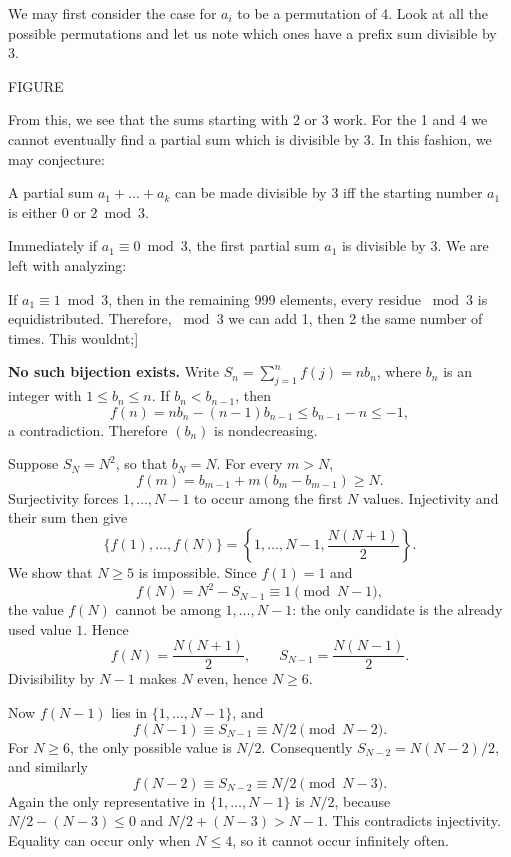 \documentclass[12pt]{memoir}
\begin{document}
\begin{Ej}
    We may first consider the case for \(a_i\) to be a permutation of 4. Look at all the possible permutations and let us note which ones have a prefix sum divisible by 3. 
    \begin{center}
        FIGURE
    \end{center}
    From this, we see that the sums starting with 2 or 3 work. For the 1 and 4 we cannot eventually find a partial sum which is divisible by 3. In this fashion, we may conjecture:
    \begin{significant}
    A partial sum \(a_1+\dots+a_k\) can be made divisible by 3 iff the starting number \(a_1\) is either \(0\) or \(2 \bmod 3\). 
    \end{significant}
    Immediately if \(a_1\equiv0\bmod 3\), the first partial sum \(a_1\) is divisible by 3. We are left with analyzing:\par
    If \(a_1\equiv 1 \bmod 3\), then in the remaining 999 elements, every residue \(\bmod 3\) is equidistributed. Therefore, \(\bmod 3\) we can add 1, then 2 the same number of times. This wouldnt;]
\end{Ej}

\begin{Ej}
\textbf{No such bijection exists.}
Write \(S_n=\sum_{j=1}^n f(j)=nb_n\), where \(b_n\) is an integer
with \(1\leq b_n\leq n\). If \(b_n<b_{n-1}\), then
\[
    f(n)=nb_n-(n-1)b_{n-1}
    \leq b_{n-1}-n\leq-1,
\]
a contradiction. Therefore \((b_n)\) is nondecreasing.

Suppose \(S_N=N^2\), so that \(b_N=N\). For every \(m>N\),
\[
    f(m)=b_{m-1}+m(b_m-b_{m-1})\geq N.
\]
Surjectivity forces \(1,\ldots,N-1\) to occur among the first \(N\)
values. Injectivity and their sum then give
\[
    \{f(1),\ldots,f(N)\}
    =\left\{1,\ldots,N-1,\frac{N(N+1)}2\right\}.
\]
We show that \(N\geq5\) is impossible. Since \(f(1)=1\) and
\[
    f(N)=N^2-S_{N-1}\equiv1\pmod{N-1},
\]
the value \(f(N)\) cannot be among \(1,\ldots,N-1\): the only candidate
is the already used value \(1\). Hence
\[
    f(N)=\frac{N(N+1)}2,\qquad S_{N-1}=\frac{N(N-1)}2.
\]
Divisibility by \(N-1\) makes \(N\) even, hence \(N\geq6\).

Now \(f(N-1)\) lies in \(\{1,\ldots,N-1\}\), and
\[
    f(N-1)\equiv S_{N-1}\equiv N/2\pmod{N-2}.
\]
For \(N\geq6\), the only possible value is \(N/2\). Consequently
\(S_{N-2}=N(N-2)/2\), and similarly
\[
    f(N-2)\equiv S_{N-2}\equiv N/2\pmod{N-3}.
\]
Again the only representative in \(\{1,\ldots,N-1\}\) is \(N/2\),
because \(N/2-(N-3)\leq0\) and \(N/2+(N-3)>N-1\).
This contradicts injectivity. Equality can occur only when \(N\leq4\),
so it cannot occur infinitely often.
\end{Ej}
\end{document}
